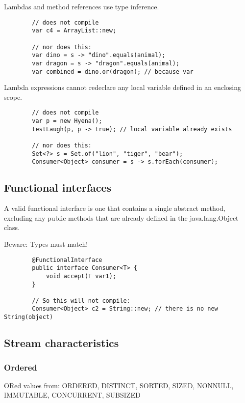 \documentclass{scrartcl}
\begin{document}
    Lambdas and method references use type inference.

    \begin{lstlisting}
        // does not compile
        var c4 = ArrayList::new;

        // nor does this:
        var dino = s -> "dino".equals(animal);
        var dragon = s -> "dragon".equals(animal);
        var combined = dino.or(dragon); // because var
    \end{lstlisting}

    Lambda expressions cannot redeclare any local variable defined in an enclosing scope.

    \begin{lstlisting}
        // does not compile
        var p = new Hyena();
        testLaugh(p, p -> true); // local variable already exists

        // nor does this:
        Set<?> s = Set.of("lion", "tiger", "bear");
        Consumer<Object> consumer = s -> s.forEach(consumer);
    \end{lstlisting}




\subsection{Functional interfaces}

    A valid functional interface is one that contains a single abstract method, excluding any public methods that are already defined in the java.lang.Object class.

    Beware: Types must match!

    \begin{lstlisting}
        @FunctionalInterface
        public interface Consumer<T> {
            void accept(T var1);
        }

        // So this will not compile:
        Consumer<Object> c2 = String::new; // there is no new String(object)
    \end{lstlisting}

\subsection{Stream characteristics}
\subsubsection{Ordered}

    ORed values from: ORDERED, DISTINCT, SORTED, SIZED, NONNULL, IMMUTABLE, CONCURRENT, SUBSIZED
\end{document}
